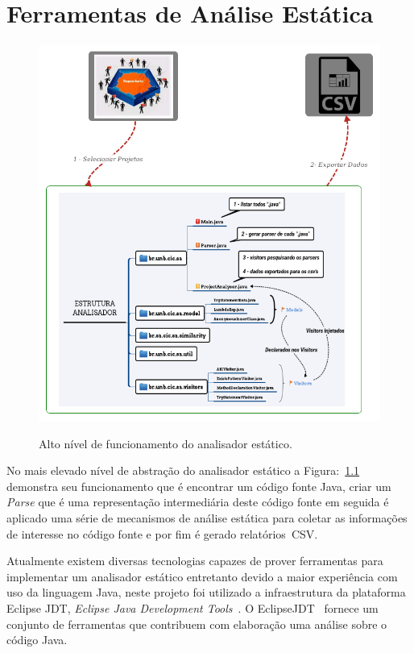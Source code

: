 \chapter {Ferramentas de Análise Estática}

\begin{figure}[h]
	\center
	\includegraphics[scale=0.55]{Imagens/Arquitetura}
	\label{fig:Arquitetura}
	\caption{Alto nível de funcionamento do analisador estático.}
\end{figure}

 No mais elevado nível de abstração do analisador estático a Figura:~\ref{fig:Arquitetura} demonstra seu funcionamento que é encontrar um código fonte Java, criar um \textit{Parse} que é uma representação intermediária deste código fonte em seguida é aplicado uma série de mecanismos de análise estática para coletar as informações de interesse no código fonte e por fim é gerado relatórios~\acs{CSV}.

Atualmente existem diversas tecnologias capazes de prover ferramentas para implementar um analisador estático entretanto devido a maior experiência com uso da linguagem Java, neste projeto foi utilizado a infraestrutura da plataforma Eclipse JDT, \textit{Eclipse Java Development Tools}~\cite{EclipseJDT}. O EclipseJDT~\cite{EclipseJDT} fornece um conjunto de ferramentas que contribuem com elaboração uma análise sobre o código Java.

